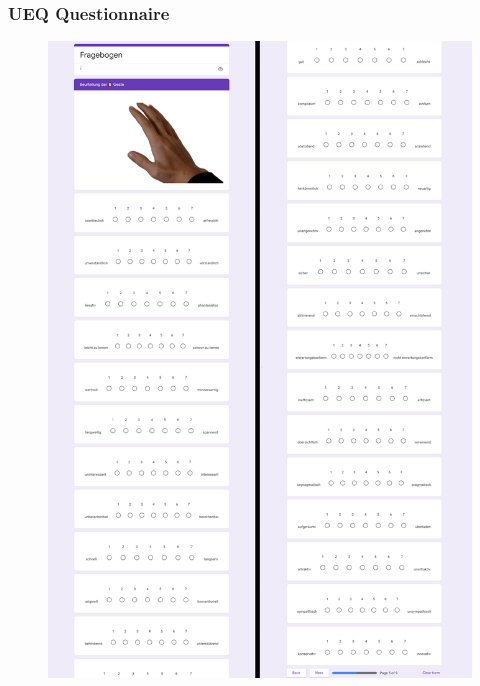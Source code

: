 \subsubsection{UEQ Questionnaire}
\begin{figure}[!h]
\centering
\includegraphics[width=\textwidth]{figures/Appendix/ueq.png}
\end{figure}

